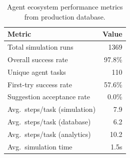 \begin{table}[htbp]
\centering
\caption{Agent ecosystem performance metrics from production database.}
\label{tab:agent-metrics}
\begin{tabular}{lr}
\toprule
Metric & Value \\
\midrule
Total simulation runs & 1369 \\
Overall success rate & 97.8\% \\
Unique agent tasks & 110 \\
First-try success rate & 57.6\% \\
Suggestion acceptance rate & 0.0\% \\
Avg.\ steps/task (simulation) & 7.9 \\
Avg.\ steps/task (database) & 6.2 \\
Avg.\ steps/task (analytics) & 10.2 \\
Avg.\ simulation time & 1.5s \\
\bottomrule
\end{tabular}
\end{table}